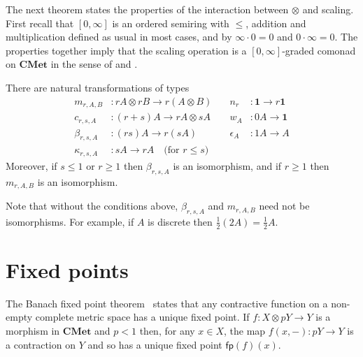 \documentclass[a4paper,UKenglish,cleveref, autoref, thm-restate]{lipics-v2021}
\newcommand{\cat}[1]{\mathbf{#1}}
\newcommand{\CMet}{\cat{CMet}}
\newcommand{\mprod}{\otimes}
\newcommand{\unit}{\mathbf{1}}
\newcommand{\scaling}{}
\newcommand{\semfp}{\mathsf{fp}}
\newcommand{\asmap}{\beta} %
\begin{document}
The next theorem states the properties of the interaction between $\mprod$ and 
scaling. First recall that $[0, \infty]$ is an ordered  
semiring with $\leq$, addition and multiplication defined as usual in most cases,
and by $\infty\cdot 0 = 0$ and $0 \cdot \infty = 0$. The properties together imply that 
the scaling operation is a $[0, \infty]$-graded comonad on $\CMet$ in the 
sense of \cite[Definition~13]{BrunelGMZ14} and \cite[Section~5.2]{GaboardiKOBU16}.

\begin{theorem} \label{thm:graded:comonad}
 There are natural transformations of  types
\begin{align*}
 m_{r,A,B} &\colon r\scaling A \mprod r\scaling B \to r\scaling (A \mprod B) \quad & 
 n_{r} &\colon \unit \to r\scaling \unit \\
 c_{r,s,A} &\colon (r+s) \scaling A \to r\scaling A \mprod s\scaling A &
 w_A &\colon 0\scaling A \to \unit \\
 \asmap_{r,s,A} &\colon (rs)\scaling A \to r\scaling (s\scaling A) & 
 \epsilon_A &\colon 1\scaling A \to A \\
  \kappa_{r,s,A} &\colon s \scaling A \to r \scaling A 	\quad \text{(for $r \leq s$)} 
\end{align*}
Moreover, if $s\leq 1$ or $r \geq 1$ then $\asmap_{r,s,A}$ is an isomorphism, and if $r\geq 1$ then $m_{r,A,B}$ is an isomorphism.
\end{theorem}

Note that without the conditions above, $\asmap_{r,s,A}$ and $m_{r,A,B}$
need not be isomorphisms. For example, if $A$ is discrete then $\frac12 (2A) = \frac12 A$.

\section{Fixed points}
\label{sec:fixed:points}

The Banach fixed point theorem~\cite{banach1922} states that any contractive function on a non-empty complete metric space has a unique fixed point. 
If $f \colon X \mprod p Y \to Y$ is a morphism in $\CMet$ and $p<1$ then, for any $x \in X$, the map $f(x, -) \colon p Y \to Y$ is a contraction on $Y$ and so has a unique fixed point $\semfp(f)(x)$. 
\end{document}

